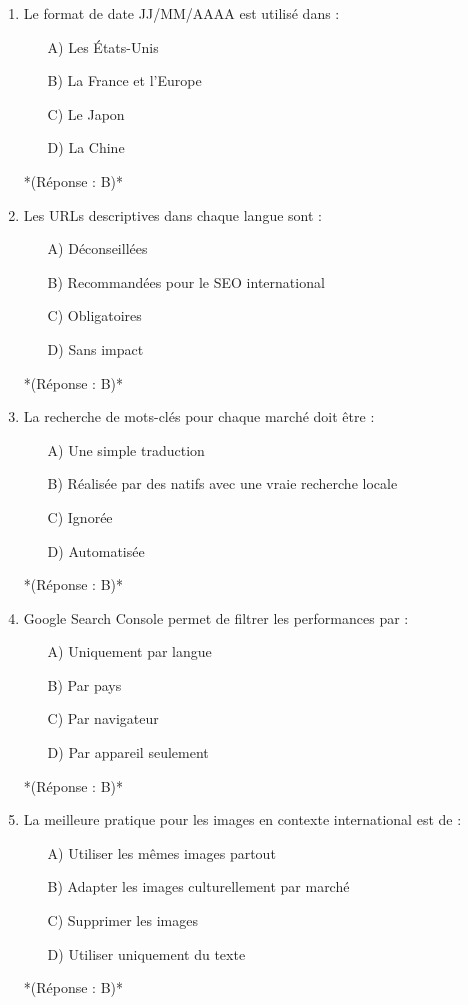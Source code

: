 \documentclass[12pt,a4paper,twoside]{report}
\begin{document}
\begin{enumerate}
\item Le format de date JJ/MM/AAAA est utilisé dans :
\begin{itemize}
\item[A)] Les États-Unis
\item[B)] La France et l'Europe
\item[C)] Le Japon
\item[D)] La Chine
\end{itemize}
*(Réponse : B)*

\item Les URLs descriptives dans chaque langue sont :
\begin{itemize}
\item[A)] Déconseillées
\item[B)] Recommandées pour le SEO international
\item[C)] Obligatoires
\item[D)] Sans impact
\end{itemize}
*(Réponse : B)*

\item La recherche de mots-clés pour chaque marché doit être :
\begin{itemize}
\item[A)] Une simple traduction
\item[B)] Réalisée par des natifs avec une vraie recherche locale
\item[C)] Ignorée
\item[D)] Automatisée
\end{itemize}
*(Réponse : B)*

\item Google Search Console permet de filtrer les performances par :
\begin{itemize}
\item[A)] Uniquement par langue
\item[B)] Par pays
\item[C)] Par navigateur
\item[D)] Par appareil seulement
\end{itemize}
*(Réponse : B)*

\item La meilleure pratique pour les images en contexte international est de :
\begin{itemize}
\item[A)] Utiliser les mêmes images partout
\item[B)] Adapter les images culturellement par marché
\item[C)] Supprimer les images
\item[D)] Utiliser uniquement du texte
\end{itemize}
*(Réponse : B)*


\end{enumerate}
\end{document}

